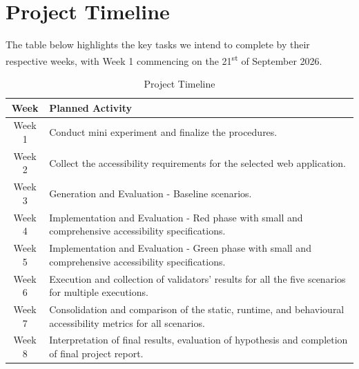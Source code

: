 \documentclass[conference]{IEEEtran}
\begin{document}
\section{Project Timeline}

The table below highlights the key tasks we intend to complete by their respective weeks,
with Week 1 commencing on the 21\textsuperscript{st} of September 2026.

\begin{table}[htbp]
\caption{Project Timeline}
\label{tab:project_timeline}
\centering
\small

\begin{tabularx}{\columnwidth}{|c|X|}
\hline
\textbf{Week} & \textbf{Planned Activity}\\ \hline

Week 1 & Conduct mini experiment and finalize the procedures. \\ \hline

Week 2 & Collect the accessibility requirements for the selected web application. \\ \hline

Week 3 & Generation and Evaluation - Baseline scenarios. \\ \hline

Week 4 & Implementation and Evaluation - Red phase with small and comprehensive accessibility specifications. \\ \hline

Week 5 & Implementation and Evaluation - Green phase with small and comprehensive accessibility specifications. \\ \hline

Week 6 & Execution and collection of validators' results for all the five scenarios for multiple executions. \\ \hline

Week 7 &  Consolidation and comparison of the static, runtime, and behavioural accessibility metrics for all scenarios. \\ \hline

Week 8 & Interpretation of final results, evaluation of hypothesis and completion of final project report. \\ \hline

\end{tabularx}
\end{table}
\end{document}
